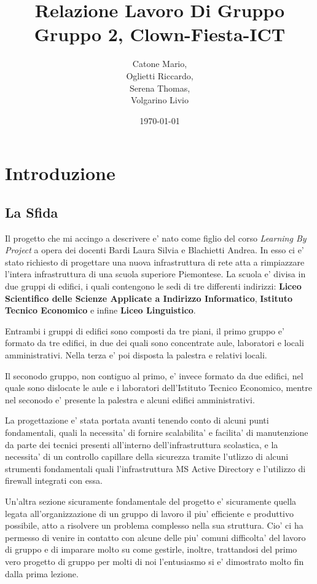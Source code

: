 \documentclass{report}
\author{Catone Mario,\\
    Oglietti Riccardo,\\
    Serena Thomas,\\
    Volgarino Livio}
\title{Relazione Lavoro Di Gruppo\\
\large Gruppo 2, Clown-Fiesta-ICT}
\date{\today}
\begin{document}
    \maketitle
    \tableofcontents
    \chapter{Introduzione}
        \section{La Sfida}
            Il progetto che mi accingo a descrivere e' nato come figlio del corso \emph{Learning By Project} a opera dei docenti 
             Bardi Laura Silvia e Blachietti Andrea. In esso ci e' stato richiesto di progettare una nuova infrastruttura di 
             rete atta a rimpiazzare l'intera infrastruttura di una scuola superiore Piemontese. La scuola e' divisa in due 
             gruppi di edifici, i quali contengono le sedi di tre differenti indirizzi: \textbf{Liceo Scientifico delle Scienze 
             Applicate a Indirizzo Informatico}, \textbf{Istituto Tecnico Economico} e infine \textbf{Liceo Linguistico}.

            Entrambi i gruppi di edifici sono composti da tre piani, il primo gruppo e' formato da tre edifici, in due 
             dei quali sono concentrate aule, laboratori e locali amministrativi. Nella terza e' poi disposta la palestra
             e relativi locali.

            Il seconodo gruppo, non contiguo al primo, e' invece formato da due edifici, nel quale sono dislocate le aule e 
             i laboratori dell'Istituto Tecnico Economico, mentre nel seconodo e' presente la palestra e alcuni edifici
             amministrativi.

            La progettazione e' stata portata avanti tenendo conto di alcuni punti fondamentali, quali la necessita' di 
             fornire scalabilita' e facilita' di manutenzione da parte dei tecnici presenti all'interno dell'infrastruttura 
             scolastica, e la necessita' di un controllo capillare della sicurezza tramite l'utlizzo di alcuni strumenti 
             fondamentali quali l'infrastruttura MS Active Directory e l'utilizzo di firewall integrati con essa. 

            Un'altra sezione sicuramente fondamentale del progetto e' sicuramente quella legata all'organizzazione di un 
             gruppo di lavoro il piu' efficiente e produttivo possibile, atto a risolvere un problema complesso nella sua 
             struttura. Cio' ci ha permesso di venire in contatto con alcune delle piu' comuni difficolta' del lavoro di
			 gruppo
             e di imparare molto su come gestirle, inoltre, trattandosi del primo vero progetto di gruppo per molti di noi 
             l'entusiasmo si e' dimostrato molto fin dalla prima lezione.
\end{document}
